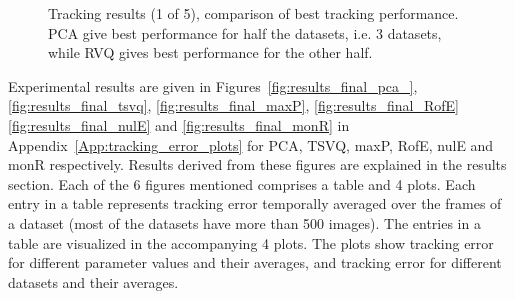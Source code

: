 								\begin{figure}[t]
								\centering
								
								\caption{Tracking results (1 of 5), comparison of best tracking performance.  PCA give best performance for half the datasets, i.e. 3 datasets, while RVQ gives best performance for the other half.}
								\label{fig:results_final_1_best}
								\end{figure}

Experimental results are given in Figures~\ref{fig:results_final_pca_}, \ref{fig:results_final_tsvq}, \ref{fig:results_final_maxP}, \ref{fig:results_final_RofE} \ref{fig:results_final_nulE} and \ref{fig:results_final_monR} in Appendix~\ref{App:tracking_error_plots} for PCA, TSVQ, maxP, RofE, nulE and monR respectively.  Results derived from these figures are explained in the results section.  Each of the 6 figures mentioned comprises a table and 4 plots.  Each entry in a table represents tracking error temporally averaged over the frames of a dataset (most of the datasets have more than 500 images).  The entries in a table are visualized in the accompanying 4 plots.  The plots show tracking error for different parameter values and their averages, and tracking error for different datasets and their averages.  

